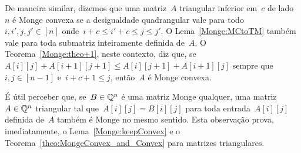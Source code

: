 De maneira similar, dizemos que uma matriz~$A$ triangular inferior em~$c$ de lado~$n$ é Monge convexa se a desigualdade quadrangular vale para todo~${ i,i',j,j' \in [n]}$ onde~${ i + c \leq i' + c \leq j \leq j' }$. O Lema~\ref{Monge:MCtoTM} também vale para toda submatriz inteiramente definida de~$A$. O Teorema~\ref{Monge:theo+1}, neste contexto, diz que, se~${ A[i][j] + A[i+1][j+1] \leq A[i][j+1] + A[i+1][j] }$ sempre que~${ i,j \in [n-1] }$ e~${ i + c + 1 \leq j }$, então~$A$ é Monge convexa.

É útil perceber que, se~$B \in \mathbb{Q}^n$ é uma matriz Monge qualquer, uma matriz~$A \in \mathbb{Q}^n$ triangular tal que~$A[i][j] = B[i][j]$ para toda entrada~$A[i][j]$ definida de~$A$ também é Monge no mesmo sentido. Esta observação prova, imediatamente, o Lema~\ref{Monge:keepConvex} e o Teorema~\ref{theo:MongeConvex_and_Convex} para matrizes triangulares.
